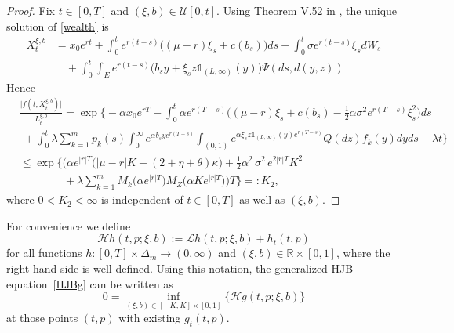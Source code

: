 \documentclass[reqno, 11pt]{amsart}%
\newcommand{\R}{\mathbb{R}}
\newcommand{\xib}{(\xi,b)}
\theoremstyle{definition}
\numberwithin{equation}{section} \numberwithin{theorem}{section}
\begin{document}
\begin{proof}
   Fix $t\in[0,T]$ and $\xib\in  \mathcal{U}[0,t]$. 
   Using Theorem V.52 in \cite{Protter2005}, the unique solution of \eqref{wealth} is 
   \begin{align*}
   X_t^{\xi,b} &= x_0e^{rt} + \int_0^t e^{r(t-s)}\big((\mu-r)\xi_s+c(b_s)\big)ds + \int_0^t \sigma e^{r(t-s)}\xi_sdW_s \\
   &\quad + \int_0^t \int_E e^{r(t-s)} \big(b_s y + \xi_s z\mathds{1}_{(L,\infty)}(y)\big)\Psi(ds,d(y,z))
   \end{align*}
   Hence
   \begin{align*}
   &\frac{\big|f(t,X^{\xi,b}_t)\big|}{L^{\xi,b}_t} = \exp\bigg\{-\alpha x_0 e^{rT} -\int_0^t \alpha e^{r(T-s)}\Big( (\mu-r)\xi_s +c(b_s) - \frac12\alpha\sigma^2 e^{r(T-s)}\xi_s^2\Big) ds  \\
   &\;+ \int_0^t\lambda \sum_{k=1}^m p_k(s) \int_0^\infty e^{\alpha b_s y e^{r(T-s)}}\int_{(0,1)} e^{\alpha \xi_s z\mathds{1}_{(L,\infty)}(y) e^{r(T-s)}}Q(dz)f_k(y)dy ds -\lambda t\bigg\} \\
   &\le\exp\bigg\{\bigg(\alpha e^{|r|T}\big(|\mu-r|K+(2+\eta+\theta)\kappa\big)+\frac12\alpha^2\,\sigma^2\, e^{2|r|T}K^2\\
   &\qquad\qquad + \lambda\sum_{k=1}^m M_k\big(\alpha e^{|r|T}\big)M_Z\big(\alpha K e^{|r|T}\big)\bigg)T\bigg\}=: K_2,
   \end{align*}
   where $0<K_2<\infty$ is independent of $t\in[0,T]$ as well as $\xib$.
\end{proof}

For convenience we define
\begin{equation}\label{H}
\mathcal{H} h(t,p;\xi,b) := \mathcal{L} h(t,p;\xi,b) + h_t(t,p)
\end{equation}
for all functions $h:[0,T]\times\Delta_m\to(0,\infty)$ and $(\xi,b)\in \R\times [0,1]$, where the right-hand side is well-defined.
Using this notation, the generalized HJB equation~\eqref{HJBg} can be written as
\begin{equation}\label{HHJB}
0= \inf_{(\xi,b)\in[-K,K]\times[0,1]}\{\mathcal{H} g(t,p;\xi,b)\}
\end{equation}
at those points $(t,p)$ with existing $g_t(t,p)$.
\end{document}
